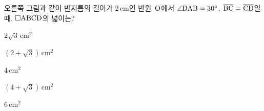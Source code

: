 \noindent\begin{minipage}[t]{0.58\linewidth}\vspace{0pt}\raggedright 오른쪽 그림과 같이 반지름의 길이가 $2\,\mathrm{cm}$인 반원~$\mathrm{O}$에서 $\angle\mathrm{DAB}=30^\circ$, $\overline{\mathrm{BC}}=\overline{\mathrm{CD}}$일 때, $\square\mathrm{ABCD}$의 넓이는?\end{minipage}\hfill\begin{minipage}[t]{0.4\linewidth}\vspace{0pt}\centering \resizebox{\ifdim\width>\linewidth\linewidth\else\width\fi}{!}{}\end{minipage}\par
\begin{choicesii}{\rule[-3ex]{0pt}{8ex}$2\sqrt{3}\,\mathrm{cm}^2$}{\rule[-3ex]{0pt}{8ex}$(2+\sqrt{3})\,\mathrm{cm}^2$}{\rule[-3ex]{0pt}{8ex}$4\,\mathrm{cm}^2$}{\rule[-3ex]{0pt}{8ex}$(4+\sqrt{3})\,\mathrm{cm}^2$}{\rule[-3ex]{0pt}{8ex}$6\,\mathrm{cm}^2$}\end{choicesii}
